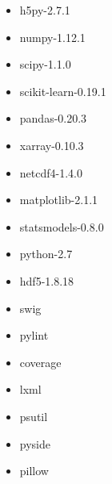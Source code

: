 \begin{itemize}
  \item h5py-2.7.1
  \item numpy-1.12.1
  \item scipy-1.1.0
  \item scikit-learn-0.19.1
  \item pandas-0.20.3
  \item xarray-0.10.3
  \item netcdf4-1.4.0
  \item matplotlib-2.1.1
  \item statsmodels-0.8.0
  \item python-2.7
  \item hdf5-1.8.18
  \item swig
  \item pylint
  \item coverage
  \item lxml
  \item psutil
  \item pyside
  \item pillow
\end{itemize}

